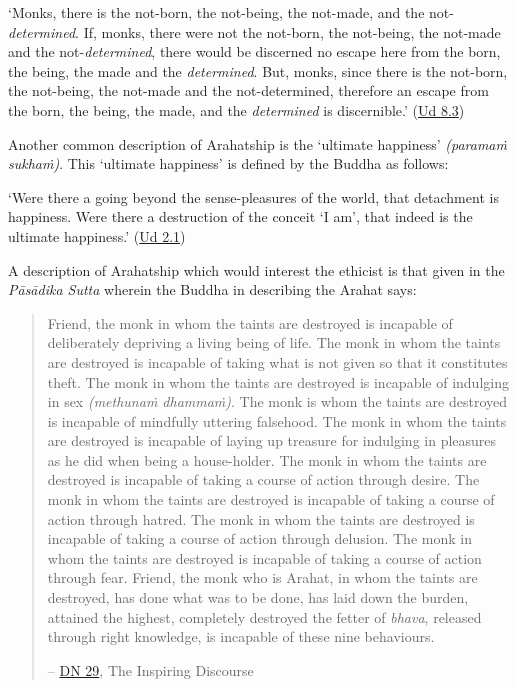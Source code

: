 `Monks, there is the not-born, the not-being, the not-made, and the not-\emph{determined}. If, monks, there were not the not-born, the not-being, the not-made and the not-\emph{determined}, there would be discerned no escape here from the born, the being, the made and the \emph{determined}. But, monks, since there is the not-born, the not-being, the not-made and the not-determined, therefore an escape from the born, the being, the made, and the \emph{determined} is discernible.' (\href{https://suttacentral.net/ud8.3/en/anandajoti}{Ud 8.3})


Another common description of Arahatship is the `ultimate happiness' \emph{(paramaṁ sukhaṁ)}. This `ultimate happiness' is defined by the Buddha as follows:

`Were there a going beyond the sense-pleasures of the world, that detachment is happiness. Were there a destruction of the conceit `I am', that indeed is the ultimate happiness.' (\href{https://suttacentral.net/ud2.1/en/anandajoti}{Ud 2.1})

A description of Arahatship which would interest the ethicist is that given in the \emph{Pāsādika Sutta} wherein the Buddha in describing the Arahat says:

\begin{quote}
Friend, the monk in whom the taints are destroyed is incapable of deliberately depriving a living being of life. The monk in whom the taints are destroyed is incapable of taking what is not given so that it constitutes theft. The monk in whom the taints are destroyed is incapable of indulging in sex \emph{(methunaṁ dhammaṁ)}. The monk is whom the taints are destroyed is incapable of mindfully uttering falsehood. The monk in whom the taints are destroyed is incapable of laying up treasure for indulging in pleasures as he did when being a house-holder. The monk in whom the taints are destroyed is incapable of taking a course of action through desire. The monk in whom the taints are destroyed is incapable of taking a course of action through hatred. The monk in whom the taints are destroyed is incapable of taking a course of action through delusion. The monk in whom the taints are destroyed is incapable of taking a course of action through fear. Friend, the monk who is Arahat, in whom the taints are destroyed, has done what was to be done, has laid down the burden, attained the highest, completely destroyed the fetter of \emph{bhava}, released through right knowledge, is incapable of these nine behaviours.

 -- \href{https://suttacentral.net/dn29/en/thanissaro}{DN 29}, The Inspiring Discourse
\end{quote}

